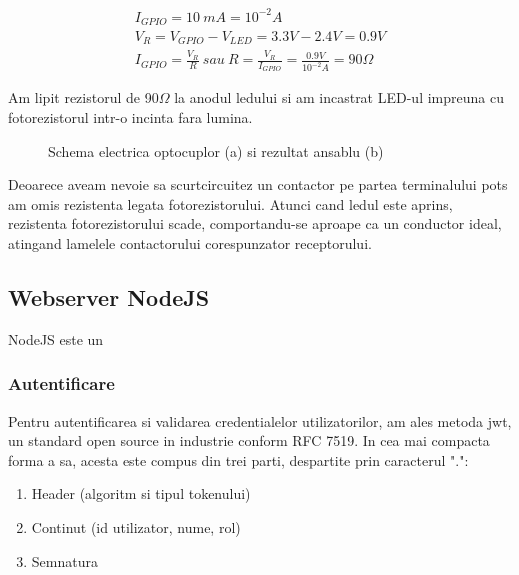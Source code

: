 \begin{center}
\begin{gather*}
I_{GPIO} =10\ mA=10^{-2} A\\
V_{R} =V_{GPIO} -V_{LED} =3.3V-2.4V=0.9V\\
I_{GPIO} =\frac{V_{R}}{R} \ sau\ R=\frac{V_{R}}{I_{GPIO}} =\frac{0.9V}{10^{-2}A} =90\Omega
\end{gather*}
\end{center}

Am lipit rezistorul de 90$\Omega$ la anodul ledului si am incastrat LED-ul impreuna cu fotorezistorul intr-o incinta fara lumina.

\begin{figure}[!ht]
\begin{center}
  \caption{Schema electrica optocuplor (a) si rezultat ansablu (b)}
  \label{fig:opto}
\end{center}
\end{figure}


Deoarece aveam nevoie sa scurtcircuitez un contactor pe partea terminalului \acrshort{pots} am omis rezistenta legata fotorezistorului. Atunci cand ledul este aprins, rezistenta fotorezistorului scade, comportandu-se aproape ca un conductor ideal, atingand lamelele contactorului corespunzator receptorului.

\subsection {Webserver NodeJS}

NodeJS este un

\subsubsection {Autentificare}

Pentru autentificarea si validarea credentialelor utilizatorilor, am ales metoda \acrfull{jwt}, un standard open source in industrie conform RFC 7519. In cea mai compacta forma a sa, acesta este compus din trei parti, despartite prin caracterul ".":

\begin{enumerate}
  \item Header (algoritm si tipul tokenului)
  \item Continut (id utilizator, nume, rol)
  \item Semnatura
\end{enumerate}

